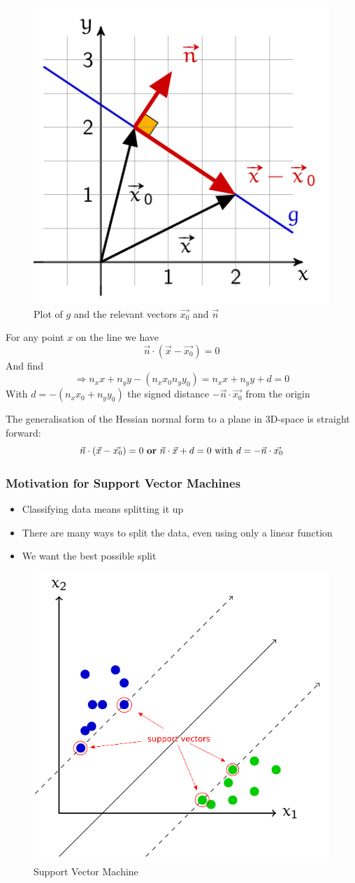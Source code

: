 \documentclass[a4paper, 11pt]{article}
\begin{document}
\begin{figure}[htb!]
	\centering
	\includegraphics[keepaspectratio, width=0.4\linewidth]{Pictures/Hessian_normal_form}
	\caption{Plot of $g$ and the relevant vectors $\vec{x_0}$ and $\vec{n}$}
	\label{fig:hessiannormalform}
\end{figure}
\noindent
For any point $x$ on the line we have
\begin{equation*}
	\vec{n}\cdot(\vec{x}-\vec{x_0})=0
\end{equation*}
\noindent
And find
\begin{equation*}
	\Rightarrow n_x x + n_y y -(n_x x_0  n_y y_0) = n_x x +n_y y + d = 0
\end{equation*}
\noindent
With $d=-(n_x x_0 +n_y y_0)$ the signed distance $-\vec{n}\cdot\vec{x_0}$ from the origin

The generalisation of the Hessian normal form to a plane in 3D-space is straight forward:
\begin{equation}
	\vec{n}\cdot(\vec{x} - \vec{x_0}) = 0 \text{ \textbf{or} } \vec{n}\cdot\vec{x} + d = 0\text{ with } d = -\vec{n}\cdot\vec{x_0}
\end{equation}

\subsubsection{Motivation for Support Vector Machines}

\begin{itemize}
	\item Classifying data means splitting it up
	\item There are many ways to split the data, even using only a linear function
	\item We want the best possible split
\end{itemize}

\begin{figure}
	\centering
	\includegraphics[keepaspectratio,width=0.4\linewidth]{Pictures/support_vector_machine_ex1}
	\caption{Support Vector Machine}
	\label{fig:supportvectormachineex1}
\end{figure}
\end{document}
